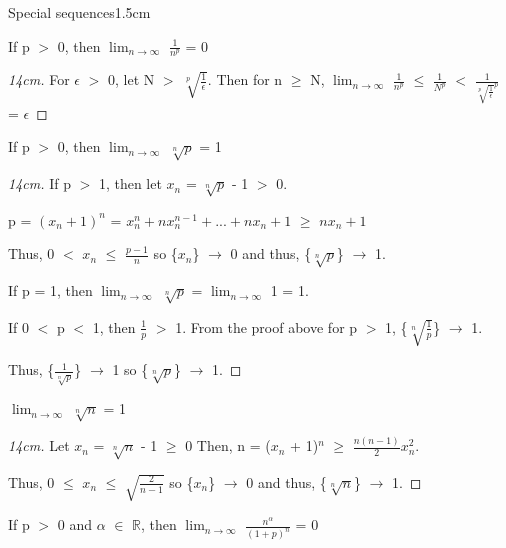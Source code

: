 	\begin{ltheorem}{Special sequences}{1.5cm}
		\item If p $>$ 0, then $\lim_{n \rightarrow \infty}$ $\frac{1}{n^p}$ = 0
		
			\begin{proof}[14cm]
				For $\epsilon$ $>$ 0, let N $>$ $\sqrt[p]{\frac{1}{\epsilon}}$.
				Then for n $\geq$ N,
				$\lim_{n \rightarrow \infty}$ $\frac{1}{n^p}$
				$\leq$ $\frac{1}{N^p}$
				$<$ $\frac{1}{\sqrt[p]{\frac{1}{\epsilon}}^p}$ = $\epsilon$				
			\end{proof}

		\item If p $>$ 0, then $\lim_{n \rightarrow \infty}$ $\sqrt[n]{p}$ = 1
		
			\begin{proof}[14cm]
				If p $>$ 1, then let $x_n$ = $\sqrt[n]{p}$ - 1 $>$ 0.

					\hspace{1cm}
					p = $(x_n + 1)^n$
					= $x_n^n + nx_n^{n-1} + ... + nx_n + 1$
					$\geq$ $nx_n + 1$

					Thus, 0 $<$ $x_n$ $\leq$ $\frac{p-1}{n}$ so
					\{$x_n$\} $\rightarrow$ 0 and thus,
					\{$\sqrt[n]{p}$\} $\rightarrow$ 1.

					If p = 1, then $\lim_{n \rightarrow \infty}$ $\sqrt[n]{p}$
					= $\lim_{n \rightarrow \infty}$ 1 = 1.

					If 0 $<$ p $<$ 1, then $\frac{1}{p}$ $>$ 1.
					From the proof above for p $>$ 1,
					\{$\sqrt[n]{\frac{1}{p}}$\} $\rightarrow$ 1.

					Thus, \{$\frac{1}{\sqrt[n]{p}}$\} $\rightarrow$ 1
					so \{$\sqrt[n]{p}$\} $\rightarrow$ 1.
			\end{proof}

		\item $\lim_{n \rightarrow \infty}$ $\sqrt[n]{n}$ = 1

			\begin{proof}[14cm]
				Let $x_n$ = $\sqrt[n]{n}$ - 1 $\geq$ 0
				Then, n = ($x_n$ + 1)$^n$ $\geq$ $\frac{n(n-1)}{2} x_n^2$.

				Thus, 0 $\leq$ $x_n$ $\leq$ $\sqrt{\frac{2}{n-1}}$
				so \{$x_n$\} $\rightarrow$ 0 and thus,
				\{$\sqrt[n]{n}$\} $\rightarrow$ 1.				
			\end{proof}

		\item If p $>$ 0 and $\alpha$ $\in$ $\mathbb{R}$, then
			$\lim_{n \rightarrow \infty}$ $\frac{n^{\alpha}}{(1+p)^n}$ = 0


\end{ltheorem}
